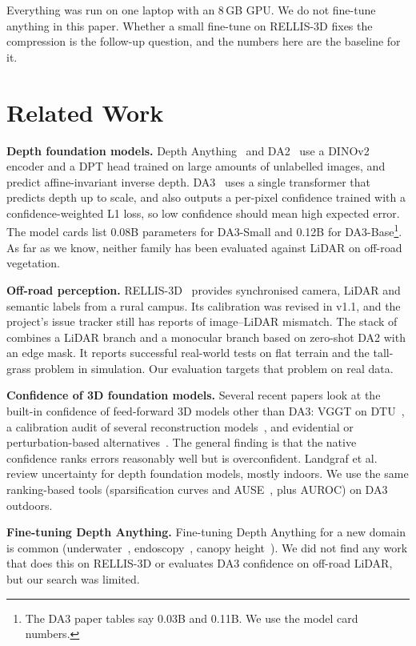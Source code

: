 \documentclass[conference]{IEEEtran}
\begin{document}
Everything was run on one laptop with an 8\,GB GPU. We do not fine-tune anything in this paper. Whether a small fine-tune on RELLIS-3D fixes the compression is the follow-up question, and the numbers here are the baseline for it.

\section{Related Work}
\textbf{Depth foundation models.} Depth Anything~\cite{da1} and DA2~\cite{da2} use a DINOv2 encoder and a DPT head trained on large amounts of unlabelled images, and predict affine-invariant inverse depth. DA3~\cite{da3} uses a single transformer that predicts depth up to scale, and also outputs a per-pixel confidence trained with a confidence-weighted L1 loss, so low confidence should mean high expected error. The model cards list 0.08B parameters for DA3-Small and 0.12B for DA3-Base\footnote{The DA3 paper tables say 0.03B and 0.11B. We use the model card numbers.}. As far as we know, neither family has been evaluated against LiDAR on off-road vegetation.

\textbf{Off-road perception.} RELLIS-3D~\cite{rellis} provides synchronised camera, LiDAR and semantic labels from a rural campus. Its calibration was revised in v1.1, and the project's issue tracker still has reports of image--LiDAR mismatch. The stack of~\cite{offroadnav} combines a LiDAR branch and a monocular branch based on zero-shot DA2 with an edge mask. It reports successful real-world tests on flat terrain and the tall-grass problem in simulation. Our evaluation targets that problem on real data.

\textbf{Confidence of 3D foundation models.} Several recent papers look at the built-in confidence of feed-forward 3D models other than DA3: VGGT on DTU~\cite{hillemann}, a calibration audit of several reconstruction models~\cite{deng}, and evidential or perturbation-based alternatives~\cite{trust3r,revar3r}. The general finding is that the native confidence ranks errors reasonably well but is overconfident. Landgraf et al.~\cite{landgraf} review uncertainty for depth foundation models, mostly indoors. We use the same ranking-based tools (sparsification curves and AUSE~\cite{ilg}, plus AUROC) on DA3 outdoors.

\textbf{Fine-tuning Depth Anything.} Fine-tuning Depth Anything for a new domain is common (underwater~\cite{underwater}, endoscopy~\cite{endo}, canopy height~\cite{canopy}). We did not find any work that does this on RELLIS-3D or evaluates DA3 confidence on off-road LiDAR, but our search was limited.
\end{document}
